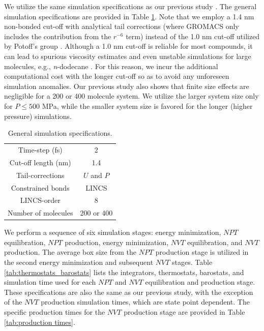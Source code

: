 \documentclass[preprint,review,12pt]{elsarticle}
\begin{document}
    We utilize the same simulation specifications as our previous study \cite{Postdoc_3}. The general simulation specifications are provided in Table \ref{tab:sim_specs}. Note that we employ a 1.4 nm non-bonded cut-off with analytical tail corrections (where GROMACS only includes the contribution from the $r^{-6}$ term) instead of the 1.0 nm cut-off utilized by Potoff's group \cite{Mie,Potoff_branched}. Although a 1.0 nm cut-off is reliable for most compounds, it can lead to spurious viscosity estimates and even unstable simulations for large molecules, e.g., \textit{n}-dodecane \cite{Postdoc_3}. For this reason, we incur the additional computational cost with the longer cut-off so as to avoid any unforeseen simulation anomalies. Our previous study also shows that finite size effects are negligible for a 200 or 400 molecule system. We utilize the larger system size only for $P \le 500$ MPa, while the smaller system size is favored for the longer (higher pressure) simulations.
	 
	 
	\begin{table}[htb!]
		\caption{General simulation specifications.} \label{tab:sim_specs}
		\begin{center}
			\begin{tabular}{|c|c|}
				\hline
				Time-step (fs) & 2 \\
				Cut-off length (nm) & 1.4 \\
				Tail-corrections & $U$ and $P$ \\
				Constrained bonds & LINCS \cite{Hess1998,Hess2008} \\
				LINCS-order & 8 \\			     
				Number of molecules & 200 or 400 \\
				\hline        
			\end{tabular}
		\end{center}
	\end{table}

	We perform a sequence of six simulation stages: energy minimization, $NPT$ equilibration, $NPT$ production, energy minimization, $NVT$ equilibration, and $NVT$ production. The average box size from the $NPT$ production stage is utilized in the second energy minimization and subsequent $NVT$ stages. Table \ref{tab:thermostats_barostats} lists the integrators, thermostats, barostats, and simulation time used for each $NPT$ and $NVT$ equilibration and production stage. These specifications are also the same as our previous study, with the exception of the $NVT$ production simulation times, which are state point dependent. The specific production times for the $NVT$ production stage are provided in Table \ref{tab:production times}.
\end{document}
